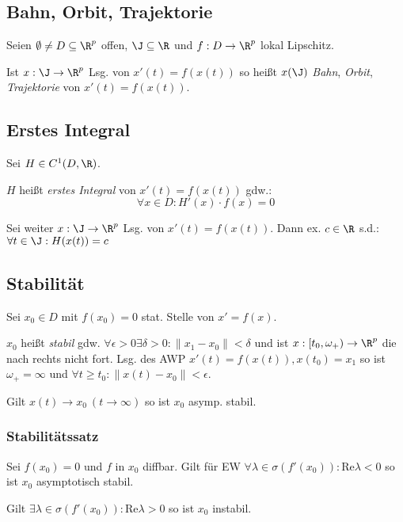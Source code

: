 \subsection*{Bahn, Orbit, Trajektorie}

Seien \(\emptyset \neq D \subseteq \R^p\) offen, \(\J \subseteq \R\) und \(f : D \to \R^p\) lokal Lipschitz.

Ist \(x : \J \to \R^p\) Lsg. von \(x'(t)=f(x(t))\) so heißt \(x(\J)\) \emph{Bahn}, \emph{Orbit}, \emph{Trajektorie} von \(x'(t)=f(x(t))\).

\subsection*{Erstes Integral}

Sei \(H \in C^1(D,\R)\).

\(H\) heißt \emph{erstes Integral} von \(x'(t)=f(x(t))\) gdw.: \[\forall x \in D : H'(x) \cdot f(x) = 0\]

Sei weiter \(x : \J \to \R^p\) Lsg. von \(x'(t)=f(x(t))\). Dann ex. \(c \in \R\) s.d.: \(\forall t \in \J : H(x(t))=c\)

\subsection*{Stabilität}

Sei \(x_0 \in D\) mit \(f(x_0)=0\) stat. Stelle von \(x'=f(x)\).

\spacing

\(x_0\) heißt \emph{stabil} gdw. \(\forall \epsilon > 0 \exists \delta > 0 : \|x_1-x_0\| < \delta\) und ist \(x : [t_0,\omega_+) \to \R^p\) die nach rechts nicht fort. Lsg. des AWP \(x'(t)=f(x(t)), x(t_0)=x_1\) so ist \(\omega_+ = \infty\) und \(\forall t \geq t_0 : \|x(t)-x_0\| < \epsilon\).

\spacing

Gilt \(x(t) \to x_0 \ (t \to \infty)\) so ist \(x_0\) asymp. stabil.

\subsubsection*{Stabilitätssatz}

Sei \(f(x_0)=0\) und \(f\) in \(x_0\) diffbar. Gilt für EW \(\forall \lambda \in \sigma(f'(x_0)) : \text{Re} \lambda < 0\) so ist \(x_0\) asymptotisch stabil.

\spacing

Gilt \(\exists \lambda \in \sigma(f'(x_0)) : \text{Re} \lambda > 0\) so ist \(x_0\) instabil.

